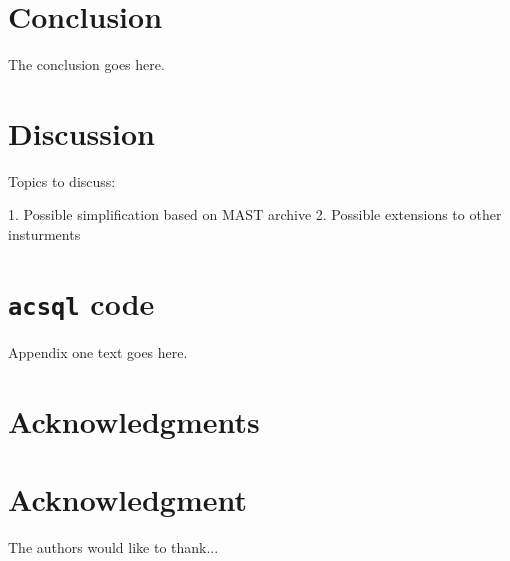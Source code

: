 \documentclass[10pt,journal,compsoc]{IEEEtran}
\begin{document}
\section{Conclusion}\label{sec:conclusion}
The conclusion goes here.

\section{Discussion}\label{sec:discussion}
Topics to discuss:

1. Possible simplification based on MAST archive
2. Possible extensions to other insturments

\appendices
\section{\texttt{acsql} code}
Appendix one text goes here.


\ifCLASSOPTIONcompsoc
  \section*{Acknowledgments}
\else
  \section*{Acknowledgment}
\fi
  The authors would like to thank...


\ifCLASSOPTIONcaptionsoff
  \newpage
\fi
\end{document}
